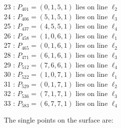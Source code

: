 \documentclass{article}
\begin{document}
{\begin{multicols}{2}
23 : $P_{401}=( 0, 1, 5, 1 )$ lies on line $\ell_{2}$\\
24 : $P_{406}=( 5, 1, 5, 1 )$ lies on line $\ell_{3}$\\
25 : $P_{437}=( 4, 5, 5, 1 )$ lies on line $\ell_{4}$\\
26 : $P_{458}=( 1, 0, 6, 1 )$ lies on line $\ell_{1}$\\
27 : $P_{465}=( 0, 1, 6, 1 )$ lies on line $\ell_{2}$\\
28 : $P_{471}=( 6, 1, 6, 1 )$ lies on line $\ell_{3}$\\
29 : $P_{512}=( 7, 6, 6, 1 )$ lies on line $\ell_{4}$\\
30 : $P_{522}=( 1, 0, 7, 1 )$ lies on line $\ell_{1}$\\
31 : $P_{529}=( 0, 1, 7, 1 )$ lies on line $\ell_{2}$\\
32 : $P_{536}=( 7, 1, 7, 1 )$ lies on line $\ell_{3}$\\
33 : $P_{583}=( 6, 7, 7, 1 )$ lies on line $\ell_{4}$\\
\end{multicols}
The single points on the surface are:\\
}
\end{document}
